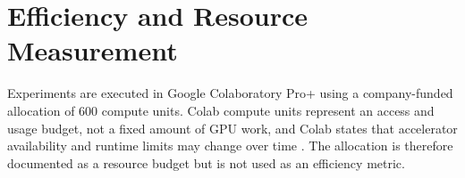 \documentclass[11pt,fleqn]{report}
\begin{document}



\section{Efficiency and Resource Measurement}
\label{subsec:efficiency_protocol}

Experiments are executed in Google Colaboratory Pro+ using a company-funded
allocation of 600 compute units. Colab compute units represent an access and
usage budget, not a fixed amount of GPU work, and Colab states that accelerator
availability and runtime limits may change over time
\cite{GoogleColabFAQ2026}. The allocation is therefore documented as a resource
budget but is not used as an efficiency metric.
\end{document}
